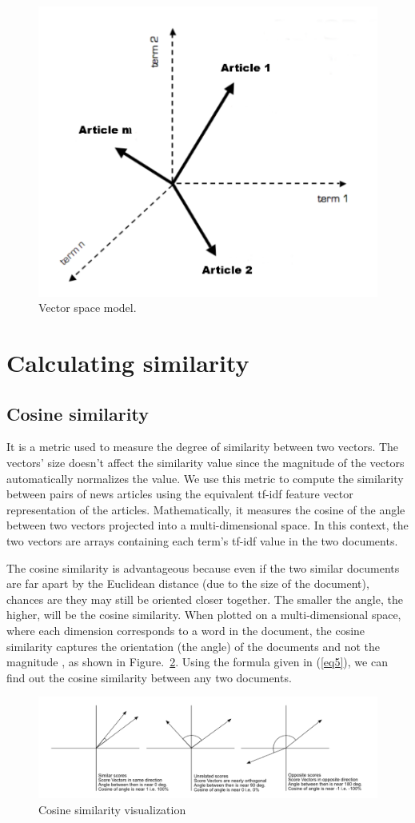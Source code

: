\documentclass[conference]{IEEEtran}
\begin{document}
\begin{figure}[htbp]
\centering
\includegraphics[width=0.4 \textwidth]{figures/vector.png}
\caption{Vector space model.}
\label{vector}
\end{figure}

\section{Calculating similarity}\label{AA}
\subsection {Cosine similarity}

It is a metric used to measure the degree of similarity between two
vectors. The vectors' size doesn't affect the similarity value since
the magnitude of the vectors automatically normalizes the value. We use
this metric to compute the similarity between pairs of news articles using the
equivalent tf-idf feature vector representation of the articles. Mathematically,
it measures the cosine of the angle between two vectors projected into a
multi-dimensional space. In this context, the two vectors are arrays containing
each term's tf-idf value in the two documents. 
\medskip

The cosine similarity is
advantageous because even if the two similar documents are far apart by the
Euclidean distance (due to the size of the document), chances are they may still
be oriented closer together. The smaller the angle, the higher, will be the
cosine similarity. When plotted on a multi-dimensional space, where each
dimension corresponds to a word in the document, the cosine similarity captures
the orientation (the angle) of the documents and not the magnitude \cite{r9}, as
shown in Figure.~\ref{cosine}. Using the formula given in (\ref{eq5}), we can
find out the cosine similarity between any two documents.

\begin{figure}[htbp]
\centering
\includegraphics[width=0.5 \textwidth]{figures/cosine.png}
\caption{Cosine similarity visualization}
\label{cosine}
\end{figure}
\end{document}
